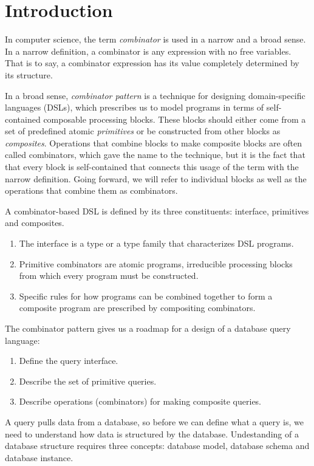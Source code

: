 
\section{Introduction}

In computer science, the term \emph{combinator} is used in a narrow and a broad
sense.  In a narrow definition, a combinator is any expression with no free
variables.  That is to say, a combinator expression has its value completely
determined by its structure.

In a broad sense, \emph{combinator pattern} is a technique for designing
domain-specific languages (DSLs), which prescribes us to model programs in
terms of self-contained composable processing blocks.  These blocks should
either come from a set of predefined atomic \emph{primitives} or be constructed
from other blocks as \emph{composites}.  Operations that combine blocks to make
composite blocks are often called combinators, which gave the name to the
technique, but it is the fact that that every block is self-contained that
connects this usage of the term with the narrow definition.  Going forward, we
will refer to individual blocks as well as the operations that combine them as
combinators.

A combinator-based DSL is defined by its three constituents: interface,
primitives and composites.

\begin{enumerate}
\item
The interface is a type or a type family that characterizes DSL programs.
\item
Primitive combinators are atomic programs, irreducible processing blocks from
which every program must be constructed.
\item
Specific rules for how programs can be combined together to form a composite
program are prescribed by compositing combinators.
\end{enumerate}

The combinator pattern gives us a roadmap for a design of a database query
language:

\begin{enumerate}
\item
Define the query interface.
\item
Describe the set of primitive queries.
\item
Describe operations (combinators) for making composite queries.
\end{enumerate}

A query pulls data from a database, so before we can define what a query is, we
need to understand how data is structured by the database.  Undestanding of a
database structure requires three concepts: database model, database schema and
database instance.

